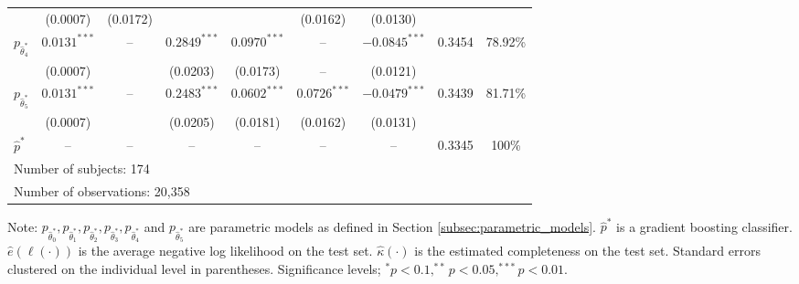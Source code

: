 \documentclass[11pt,a4paper]{article}
\theoremstyle{definition}
\begin{document}
\begin{table}[!ht]
\begin{threeparttable}
\begin{footnotesize}
{\begin{tabular}{@{}lcccccccc@{}}
                & (0.0007)                 & (0.0172)                   &                      &                      & (0.0162)             & (0.0130)             &                      &                      \\
$p_{\hat{\theta}_4^*}$                & $0.0131^{***}$           & --                         & $0.2849^{***}$       & $0.0970^{***}$       & --                   & $-0.0845^{***}$      & 0.3454               & 78.92\%              \\
                & (0.0007)                 &                         & (0.0203)             & (0.0173)             & --                   & (0.0121)    &                      &                      \\
$p_{\hat{\theta}_5^*}$                & $0.0131^{***}$           & --                         & $0.2483^{***}$       & $0.0602^{***}$       & $0.0726^{***}$       & $-0.0479^{***}$      & 0.3439               & 81.71\%              \\
                & (0.0007)                 &                          & (0.0205)             & (0.0181)             & (0.0162)             & (0.0131)             &                      &                      \\
$\hat{p}^*$               & --                       & --                         & --                   & --                   & --                   & --                   & 0.3345               & 100\%                \\ \midrule
\multicolumn{8}{l}{Number of subjects: 174}                                                                                                            \\
\multicolumn{8}{l}{Number of observations: 20,358}   \\
\bottomrule\bottomrule
\end{tabular}}
\end{footnotesize}
\begin{tablenotes}
      \footnotesize
      \item Note: $p_{\hat{\theta}^*_0},p_{\hat{\theta}^*_1},p_{\hat{\theta}^*_2},p_{\hat{\theta}^*_3},p_{\hat{\theta}^*_4}$ and $p_{\hat{\theta}^*_5}$ are parametric models as defined in Section \ref{subsec:parametric_models}. $\hat{p}^*$ is a gradient boosting classifier. $\hat{e}(\ell(\cdot))$ is the average negative log likelihood on the test set.  $\hat{\kappa}(\cdot)$ is the estimated completeness on the test set. Standard errors clustered on the individual level in parentheses. Significance levels; $^*p<0.1, ^{**}p<0.05,^{***}p<0.01$.
    \end{tablenotes}
\end{threeparttable}
\end{table}
\end{document}
